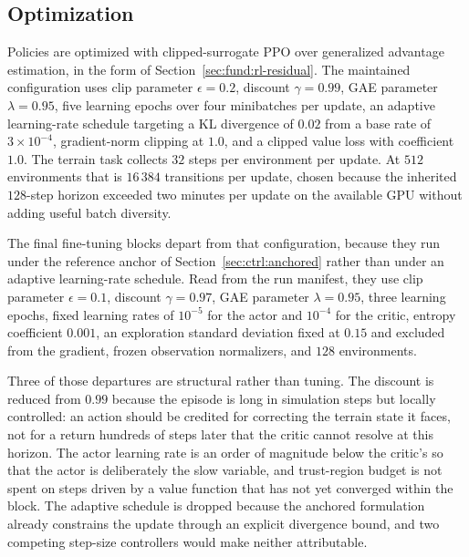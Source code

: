\subsection{Optimization}
\label{sec:ctrl:optimization}

Policies are optimized with clipped-surrogate PPO over generalized advantage
estimation, in the form of Section~\ref{sec:fund:rl-residual}. The maintained
configuration uses clip parameter $\epsilon = 0.2$, discount $\gamma = 0.99$,
GAE parameter $\lambda = 0.95$, five learning epochs over four minibatches per
update, an adaptive learning-rate schedule targeting a KL divergence of $0.02$
from a base rate of $3\times10^{-4}$, gradient-norm clipping at $1.0$, and a
clipped value loss with coefficient $1.0$. The terrain task collects $32$ steps
per environment per update. At $512$ environments that is $16\,384$ transitions
per update, chosen because the inherited $128$-step horizon exceeded two
minutes per update on the available GPU without adding useful batch diversity.

The final \ppoROM{} fine-tuning blocks depart from that configuration, because
they run under the reference anchor of Section~\ref{sec:ctrl:anchored} rather
than under an adaptive learning-rate schedule. Read from the run manifest, they
use clip parameter $\epsilon = 0.1$, discount $\gamma = 0.97$, GAE parameter
$\lambda = 0.95$, three learning epochs, fixed learning rates of $10^{-5}$ for
the actor and $10^{-4}$ for the critic, entropy coefficient $0.001$, an
exploration standard deviation fixed at $0.15$ and excluded from the gradient,
frozen observation normalizers, and $128$ environments.

Three of those departures are structural rather than tuning. The discount is
reduced from $0.99$ because the episode is long in simulation steps but locally
controlled: an action should be credited for correcting the terrain state it
faces, not for a return hundreds of steps later that the critic cannot resolve
at this horizon. The actor learning rate is an order of magnitude below the
critic's so that the actor is deliberately the slow variable, and trust-region
budget is not spent on steps driven by a value function that has not yet
converged within the block. The adaptive schedule is dropped because the
anchored formulation already constrains the update through an explicit
divergence bound, and two competing step-size controllers would make neither
attributable.

